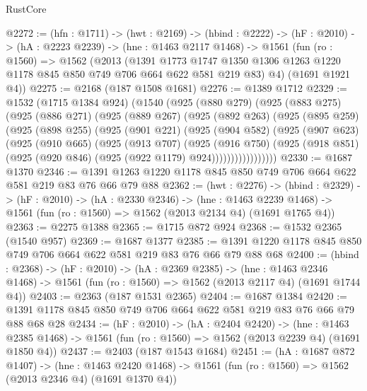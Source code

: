 \begin{lexlean}{RustCore}
\begin{coremodule}
@2272 := (hfn : @1711) ->
  (hwt : @2169) ->
  (hbind : @2222) ->
  (hF : @2010) ->
  (hA : @2223 @2239) ->
  (hne : @1463 @2117 @1468) ->
  @1561
    (fun (ro : @1560) =>
    @1562
      (@2013
        (@1391
          @1773
          @1747
          @1350
          @1306
          @1263
          @1220
          @1178
          @845
          @850
          @749
          @706
          @664
          @622
          @581
          @219
          @83)
        @4)
      (@1691 @1921 @4))
@2275 := @2168 (@187 @1508 @1681)
@2276 := @1389 @1712
@2329 := @1532
    (@1715 @1384 @924)
    (@1540
      (@925
        (@880 @279)
        (@925
          (@883 @275)
          (@925
            (@886 @271)
            (@925
              (@889 @267)
              (@925
                (@892 @263)
                (@925
                  (@895 @259)
                  (@925
                    (@898 @255)
                    (@925
                      (@901 @221)
                      (@925
                        (@904 @582)
                        (@925
                          (@907 @623)
                          (@925
                            (@910 @665)
                            (@925
                              (@913 @707)
                              (@925
                                (@916 @750)
                                (@925
                                  (@918 @851)
                                  (@925 (@920 @846) (@925 (@922 @1179) @924)))))))))))))))))
@2330 := @1687 @1370
@2346 := @1391 @1263 @1220 @1178 @845 @850 @749 @706 @664 @622 @581 @219 @83 @76 @66 @79 @88
@2362 := (hwt : @2276) ->
  (hbind : @2329) ->
  (hF : @2010) ->
  (hA : @2330 @2346) ->
  (hne : @1463 @2239 @1468) -> @1561 (fun (ro : @1560) => @1562 (@2013 @2134 @4) (@1691 @1765 @4))
@2363 := @2275 @1388
@2365 := @1715 @872 @924
@2368 := @1532 @2365 (@1540 @957)
@2369 := @1687 @1377
@2385 := @1391 @1220 @1178 @845 @850 @749 @706 @664 @622 @581 @219 @83 @76 @66 @79 @88 @68
@2400 := (hbind : @2368) ->
  (hF : @2010) ->
  (hA : @2369 @2385) ->
  (hne : @1463 @2346 @1468) -> @1561 (fun (ro : @1560) => @1562 (@2013 @2117 @4) (@1691 @1744 @4))
@2403 := @2363 (@187 @1531 @2365)
@2404 := @1687 @1384
@2420 := @1391 @1178 @845 @850 @749 @706 @664 @622 @581 @219 @83 @76 @66 @79 @88 @68 @28
@2434 := (hF : @2010) ->
  (hA : @2404 @2420) ->
  (hne : @1463 @2385 @1468) -> @1561 (fun (ro : @1560) => @1562 (@2013 @2239 @4) (@1691 @1850 @4))
@2437 := @2403 (@187 @1543 @1684)
@2451 := (hA : @1687 @872 @1407) ->
  (hne : @1463 @2420 @1468) -> @1561 (fun (ro : @1560) => @1562 (@2013 @2346 @4) (@1691 @1370 @4))

\end{coremodule}
\end{lexlean}
